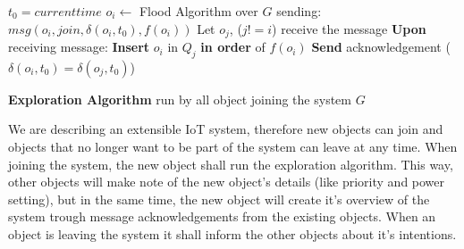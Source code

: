\documentclass[../main/Self-Stabilization.tex]{subfiles}
\begin{document}
\LinesNumbered
\IncMargin{1em}
\begin{algorithm}
$t_{0} = current time$ 
\BlankLine
$o_{i} \gets$ Flood Algorithm over $G$ \newline
sending: $msg(o_{i}, join, \delta(o_{i}, t_{0}), f(o_{i}))$
\BlankLine
{} {
    Let $o_{j}$, ($j!=i$) receive the message
    \BlankLine
    \textbf{Upon} receiving message:\newline
    {
       \textbf{Insert} $o_{i}$ in $Q_{j}$ \textbf{in order} of $f(o_{i})$
       \textbf{Send} acknowledgement ($\delta(o_{i},t_{0}) = \delta(o_{j},t_{0})$)
    }
}
\caption{\textbf{Exploration Algorithm} run by all object joining the system $G$} \label{algo2}
\end{algorithm}
\DecMargin{1em}

We are describing an extensible IoT system, therefore new objects can join and objects that no longer want to be part of the system can leave at any time. When joining the system, the new object shall run the exploration algorithm. This way, other objects will make note of the new object's details (like priority and power setting), but in the same time, the new object will create it's overview of the system trough message acknowledgements from the existing objects. When an object is leaving the system it shall inform the other objects about it's intentions.
\end{document}
